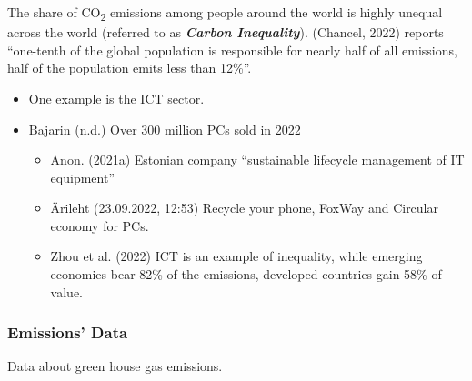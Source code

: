\documentclass[
  letterpaper,
  DIV=11,
  numbers=noendperiod]{scrartcl}
\providecommand{\tightlist}{%
  \setlength{\itemsep}{0pt}\setlength{\parskip}{0pt}}\usepackage{longtable,booktabs,array}
\begin{document}
The share of CO\textsubscript{2} emissions among people around the world
is highly unequal across the world (referred to as \textbf{\emph{Carbon
Inequality}}). (Chancel, 2022) reports ``one-tenth of the global
population is responsible for nearly half of all emissions, half of the
population emits less than 12\%''.

\begin{itemize}
\item
  One example is the ICT sector.
\item
  Bajarin (n.d.) Over 300 million PCs sold in 2022

  \begin{itemize}
  \tightlist
  \item
    Anon. (2021a) Estonian company ``sustainable lifecycle management of
    IT equipment''
  \item
    Ärileht (23.09.2022, 12:53) Recycle your phone, FoxWay and Circular
    economy for PCs.
  \item
    Zhou et al. (2022) ICT is an example of inequality, while emerging
    economies bear 82\% of the emissions, developed countries gain 58\%
    of value.
  \end{itemize}
\end{itemize}

\subsubsection{Emissions' Data}\label{emissions-data}

Data about green house gas emissions.
\end{document}
